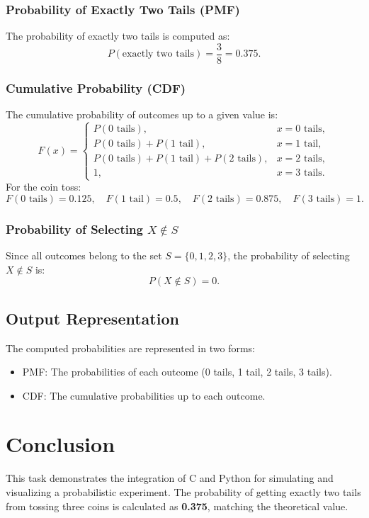 \documentclass[journal]{IEEEtran}
\begin{document}
\subsubsection*{Probability of Exactly Two Tails (PMF)}
The probability of exactly two tails is computed as:
\[
P(\text{exactly two tails}) = \frac{3}{8} = 0.375.
\]

\subsubsection*{Cumulative Probability (CDF)}
The cumulative probability of outcomes up to a given value is:
\[
F(x) = 
\begin{cases} 
P(0 \text{ tails}), & x = 0 \text{ tails}, \\
P(0 \text{ tails}) + P(1 \text{ tail}), & x = 1 \text{ tail}, \\
P(0 \text{ tails}) + P(1 \text{ tail}) + P(2 \text{ tails}), & x = 2 \text{ tails}, \\
1, & x = 3 \text{ tails}.
\end{cases}
\]
For the coin toss:
\[
F(0 \text{ tails}) = 0.125, \quad F(1 \text{ tail}) = 0.5, \quad F(2 \text{ tails}) = 0.875, \quad F(3 \text{ tails}) = 1.
\]

\subsubsection*{Probability of Selecting \( X \notin S \)}
Since all outcomes belong to the set \( S = \{0, 1, 2, 3\}\), the probability of selecting \( X \notin S \) is:
\[
P(X \notin S) = 0.
\]

\subsection*{Output Representation}
The computed probabilities are represented in two forms:
\begin{itemize}
    \item PMF: The probabilities of each outcome (0 tails, 1 tail, 2 tails, 3 tails).
    \item CDF: The cumulative probabilities up to each outcome.
\end{itemize}

\section*{Conclusion}
This task demonstrates the integration of C and Python for simulating and visualizing a probabilistic experiment. The probability of getting exactly two tails from tossing three coins is calculated as \textbf{0.375}, matching the theoretical value.
\end{document}
